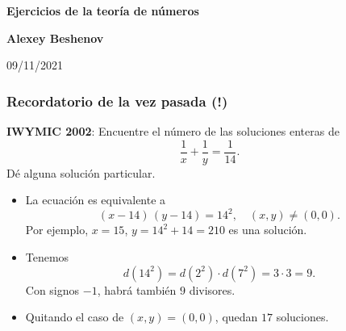 \documentclass[handout]{beamer}
\begin{document}

\begin{frame}[noframenumbering]
  \begin{center}
    {\LARGE\bf Ejercicios de la teoría de números

    }

    \vspace{3em}

    {\large\bf Alexey Beshenov}

    \vspace{4em}

    09/11/2021

  \end{center}
\end{frame}


\begin{frame}[fragile]
  \frametitle{Recordatorio de la vez pasada (!)}

  \begin{shaded}
    \textbf{IWYMIC 2002}: Encuentre el número de las soluciones enteras de
    $$\frac{1}{x} + \frac{1}{y} = \frac{1}{14}.$$
    Dé alguna solución particular.
  \end{shaded}

  \ifdefined\solutions

  \begin{itemize}
  \item<3-> La ecuación es equivalente a
    $$(x - 14)\,(y - 14) = 14^2, \quad (x,y) \ne (0,0).$$
    Por ejemplo, $x = 15$, $y = 14^2 + 14 = 210$ es una solución.

  \item<4-> Tenemos
    $$d (14^2) = d (2^2) \cdot d (7^2) = 3\cdot 3 = 9.$$
    Con signos $-1$, habrá también $9$ divisores.

  \item<5-> Quitando el caso de $(x,y) = (0,0)$, quedan $17$ soluciones.
  \end{itemize}
  \else\fi
\end{frame}

\end{document}
